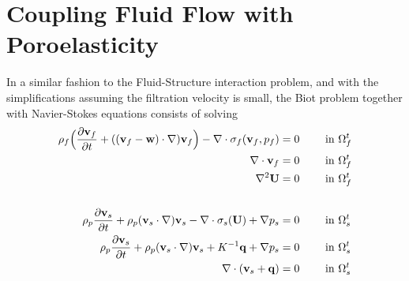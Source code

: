 \section{Coupling Fluid Flow with Poroelasticity}
In a similar fashion to the Fluid-Structure interaction problem, and with the simplifications assuming the filtration velocity is small, the Biot problem together with Navier-Stokes equations consists of solving
\begin{alignat}{3}
\rho_f \Big{(} \frac{\partial \mathbf{v}_f}{\partial t} + ((\mathbf{v}_f-\mathbf{w})  \cdot \nabla )  \mathbf{v}_f \Big{)} - \nabla \cdot \sigma_f(\mathbf{v}_f,p_f)& =  0 \quad  && \text{ in } \Omega_f^t \\
\nabla \cdot \mathbf{v}_f & = 0 && \text{ in } \Omega_f^t\\
\nabla ^2 \mathbf{U} & = 0 && \text{ in } \Omega_f^t
\\
\\
\rho_p \frac{\partial \mathbf{v}_s}{\partial t} + \rho_p(\mathbf{v}_s\cdot\nabla)\mathbf{v}_s - \nabla \cdot \sigma_s(\mathbf{U}) + \nabla p_s & =  0 && \text{ in } \Omega_s^t \\
\rho_p \frac{\partial \mathbf{v}_s}{\partial t} + \rho_p(\mathbf{v}_s\cdot\nabla)\mathbf{v}_s + K^{-1}\mathbf{q} + \nabla p_s & =  0 && \text{ in } \Omega_s^t \\
\nabla \cdot (\mathbf{v}_s + \mathbf{q}) & = 0 && \text{ in } \Omega_s^t \\
\end{alignat}

